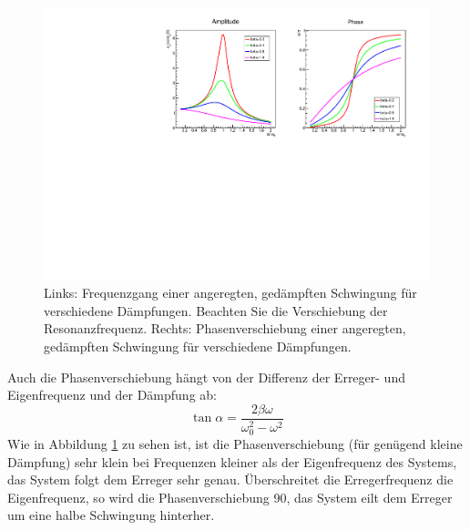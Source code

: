 \begin{figure}[ht!]
	\centering
	\includegraphics[width=\textwidth]{Abbildungen/ampl_phase.pdf}
	\caption{Links: Frequenzgang einer angeregten, gedämpften Schwingung für verschiedene Dämpfungen. Beachten Sie die Verschiebung der Resonanzfrequenz. Rechts: Phasenverschiebung einer angeregten, gedämpften Schwingung für verschiedene Dämpfungen.}
	\label{fig:Resonanz}
\end{figure}

Auch die Phasenverschiebung hängt von der Differenz der Erreger- und Eigenfrequenz und der Dämpfung ab:
\begin{equation*}
	\tan\alpha = \frac{2\beta\omega}{\omega_0^2-\omega^2}
\end{equation*}
Wie in Abbildung \ref{fig:Resonanz} zu sehen ist, ist die Phasenverschiebung (für genügend kleine Dämpfung) sehr klein bei Frequenzen kleiner als der Eigenfrequenz des Systems, das System folgt dem Erreger sehr genau. Überschreitet die Erregerfrequenz die Eigenfrequenz, so wird die Phasenverschiebung 90\degree, das System eilt dem Erreger um eine halbe Schwingung hinterher.

